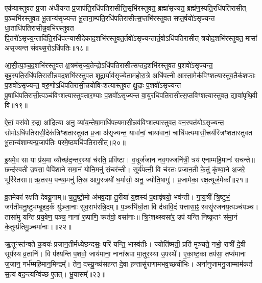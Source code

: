 {\anuvakamend[{वसू॑नां भा॒गो॑\-ऽसि॒ षट्च॑त्वारिꣳशच्च॥९॥}]}

एक॑यास्तुवत प्र॒जा अ॑धीयन्त प्र॒जाप॑ति॒रधि॑पतिरासीत्ति॒सृभि॑रस्तुवत॒ ब्रह्मा॑सृज्यत॒ ब्रह्म॑ण॒स्पति॒रधि॑पतिरासीत् प॒ञ्चभि॑रस्तुवत भू॒तान्य॑सृज्यन्त भू॒ताना॒म्पति॒रधि॑पतिरासीत्स॒प्तभि॑रस्तुवत सप्त॒र्\mbox{}षयो॑\-ऽसृज्यन्त धा॒ताधि॑पतिरा\-सीन्न॒वभि॑रस्तुवत पि॒तरो॑\-ऽसृज्य॒न्तादि॑ति॒रधि॑पत्न्यासीदेकाद॒शभि॑रस्तुवत॒र्तवो॑\-ऽसृज्यन्तार्त॒वो\-ऽधि॑पतिरासीत् त्रयोद॒शभि॑रस्तुवत॒ मासा॑ असृज्यन्त संवथ्स॒रो\-ऽधि॑पतिः॥१८॥

आ॒सी॒त्प॒ञ्च॒द॒शभि॑रस्तुवत क्ष॒त्रम॑सृज्य॒तेन्द्रो\-ऽधि॑पतिरासीत्सप्तद॒शभि॑रस्तुवत प॒शवो॑\-ऽसृज्यन्त॒ बृह॒स्पति॒रधि॑पतिरासी\-न्नवद॒शभि॑रस्तुवत शूद्रा॒र्याव॑सृज्येतामहोरा॒त्रे अधि॑पत्नी आस्ता॒मेक॑विꣳशत्यास्तुव॒तैक॑शफाः प॒शवो॑\-ऽसृज्यन्त॒ वरु॒णो\-ऽधि॑पतिरासी॒त्त्रयो॑विꣳशत्यास्तुवत क्षु॒द्राः प॒शवो॑\-ऽसृज्यन्त पू॒षाधि॑पतिरासी॒त्पञ्च॑विꣳशत्यास्तुवतार॒ण्याः प॒शवो॑\-ऽसृज्यन्त वा॒युरधि॑पतिरासीत्स॒प्तविꣳ॑शत्यास्तुवत॒ द्यावा॑पृथि॒वी वि॥१९॥

ऐ॒तां॒ वस॑वो रु॒द्रा आ॑दि॒त्या अनु॒ व्या॑य॒न्तेषा॒माधि॑पत्यमासी॒न्नव॑विꣳशत्यास्तुवत॒ वन॒स्पत॑यो\-ऽसृज्यन्त॒ सोमो\-ऽ\-धि॑पतिरासी॒देक॑त्रिꣳशतास्तुवत प्र॒जा अ॑सृज्यन्त॒ यावा॑नां॒ चाया॑वानां॒ चाधि॑पत्यमासी॒त्त्रय॑स्त्रिꣳशतास्तुवत भू॒तान्य॑शाम्यन्प्र॒जाप॑तिः परमे॒ष्ठ्यधि॑पतिरासीत्॥२०॥

{\anuvakamend[{सं॒ व॒थ्स॒रो\-ऽधि॑पति॒र्वि पञ्च॑त्रिꣳशच्च॥10॥}]}

इ॒यमे॒व सा या प्र॑थ॒मा व्यौच्छ॑द॒न्तर॒स्यां च॑रति॒ प्रवि॑ष्टा। व॒धूर्ज॑जान नव॒गज्जनि॑त्री॒ त्रय॑ एनाम्महि॒मानः॑ सचन्ते॥ छन्द॑स्वती उ॒षसा॒ पेपि॑शाने समा॒नं योनि॒मनु॑ सं॒चर॑न्ती। सूर्य॑पत्नी॒ वि च॑रतः प्रजान॒ती के॒तुं कृ॑ण्वा॒ने अ॒जरे॒ भूरि॑रेतसा॥ ऋ॒तस्य॒ पन्था॒मनु॑ ति॒स्र आगु॒स्त्रयो॑ घ॒र्मासो॒ अनु॒ ज्योति॒षागुः॑। प्र॒जामेका॒ रक्ष॒त्यूर्ज॒मेका᳚॥२१॥

व्र॒तमेका॑ रक्षति देवयू॒नाम्॥ च॒तु॒ष्टो॒मो अ॑भव॒द्या तु॒रीया॑ य॒ज्ञस्य॑ प॒क्षावृ॑षयो॒ भव॑न्ती। गा॒य॒त्रीं त्रि॒ष्टुभं॒ जग॑तीमनु॒ष्टुभ॑म्बृ॒हद॒र्कं यु॑ञ्जा॒नाः सुव॒राभ॑रन्नि॒दम्॥ प॒ञ्चभि॑र्धा॒ता वि द॑धावि॒दं यत्तासा॒ꣴ॒ स्वसॄ॑रजनय॒त्पञ्च॑पञ्च। तासा॑मु यन्ति प्रय॒वेण॒ पञ्च॒ नाना॑ रू॒पाणि॒ क्रत॑वो॒ वसा॑नाः॥ त्रि॒ꣳ॒शथ्स्वसा॑र॒ उप॑ यन्ति निष्कृ॒तꣳ स॑मा॒नं के॒तुम्प्र॑तिमु॒ञ्चमा॑नाः।॥२२॥

ऋ॒तूꣳस्त॑न्वते क॒वयः॑ प्रजान॒तीर्मध्ये॑छन्दसः॒ परि॑ यन्ति॒ भास्व॑तीः। ज्योति॑ष्मती॒ प्रति॑ मुञ्चते॒ नभो॒ रात्री॑ दे॒वी सूर्य॑स्य व्र॒तानि॑। वि प॑श्यन्ति प॒शवो॒ जाय॑माना॒ नाना॑रूपा मा॒तुर॒स्या उ॒पस्थे᳚। ए॒का॒ष्ट॒का तप॑सा॒ तप्य॑माना ज॒जान॒ गर्भ॑म्महि॒मान॒मिन्द्रम्᳚। तेन॒ दस्यू॒न्व्य॑सहन्त दे॒वा ह॒न्तासु॑राणामभव॒च्छची॑भिः। अना॑नुजामनु॒जाम्माम॑कर्त स॒त्यं वद॒न्त्यन्वि॑च्छ ए॒तत्। भू॒यासम्᳚॥२३॥

